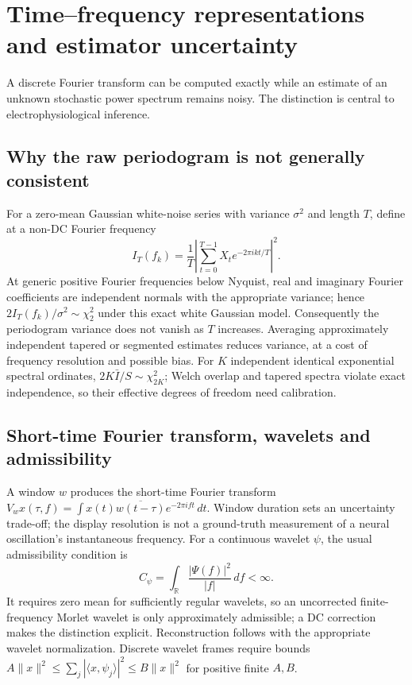 \chapter[Wavelets and spectral inference]{Time--frequency representations and estimator uncertainty}
\label{ch:spectral-inference}
A discrete Fourier transform can be computed exactly while
an estimate of an unknown stochastic power spectrum remains
noisy. The distinction is central to electrophysiological inference.

\section{Why the raw periodogram is not generally consistent}
For a zero-mean Gaussian white-noise series with variance $\sigma^2$
and length $T$, define at a non-DC Fourier frequency
\[
I_T(f_k)=\frac{1}{T}\left|\sum_{t=0}^{T-1}
 X_t e^{-2\pi ikt/T}\right|^2.
\]
At generic positive Fourier frequencies below Nyquist, real and
imaginary Fourier coefficients are independent normals with the
appropriate variance; hence
$2I_T(f_k)/\sigma^2\sim\chi^2_2$
under this exact white Gaussian model. Consequently the
periodogram variance does not vanish as $T$ increases.
Averaging approximately independent tapered or segmented
estimates reduces variance, at a cost of frequency resolution
and possible bias. For $K$ independent identical exponential
spectral ordinates, $2K\bar I/S\sim\chi^2_{2K}$;
Welch overlap and tapered spectra violate exact independence,
so their effective degrees of freedom need calibration.

\section{Short-time Fourier transform, wavelets and admissibility}
A window $w$ produces the short-time Fourier transform
$V_wx(\tau,f)=\int x(t)\overline{w(t-\tau)}
 e^{-2\pi ift}\,dt$. Window duration sets an uncertainty
trade-off; the display resolution is not a ground-truth
measurement of a neural oscillation's instantaneous frequency.
For a continuous wavelet $\psi$, the usual admissibility
condition is
\[
C_\psi=\int_{\mathbb R}\frac{|\Psi(f)|^2}{|f|}\,df<\infty.
\]
It requires zero mean for sufficiently regular wavelets,
so an uncorrected finite-frequency Morlet wavelet is only
approximately admissible; a DC correction makes the distinction
explicit. Reconstruction follows with the appropriate wavelet
normalization. Discrete wavelet frames require bounds
$A\|x\|^2\le\sum_j|\langle x,\psi_j\rangle|^2
\le B\|x\|^2$ for positive finite $A,B$.

